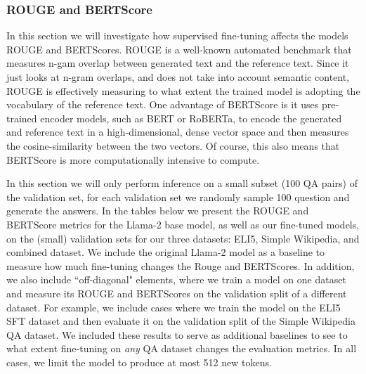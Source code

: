 \documentclass[11pt, oneside]{article}   	%
\begin{document}
\subsubsection{ROUGE and BERTScore}
In this section we will investigate how supervised fine-tuning affects the models ROUGE and BERTScores.
ROUGE is a well-known automated benchmark that measures n-gam overlap between generated text and the reference text.
Since it just looks at n-gram overlaps, and does not take into account semantic content, ROUGE is effectively measuring to what extent the trained model is adopting the vocabulary of the reference text.
One advantage of BERTScore is it uses pre-trained encoder models, such as BERT or RoBERTa, to encode the generated and reference text in a high-dimensional, dense vector space and then measures the cosine-similarity between the two vectors.
Of course, this also means that BERTScore is more computationally intensive to compute.

In this section we will only perform inference on a small subset (100 QA pairs) of the validation set, for each validation set we randomly sample 100 question and generate the answers.
In the tables below we present the ROUGE and BERTScore metrics for the Llama-2 base model, as well as our fine-tuned models, on the (small) validation sets for our three datasets: ELI5, Simple Wikipedia, and combined dataset.
We include the original Llama-2 model as a baseline to measure how much fine-tuning changes the Rouge and BERTScores.
In addition, we also include ``off-diagonal" elements, where we train a model on one dataset and measure its ROUGE and BERTScores on the validation split of a different dataset.
For example, we include cases where we train the model on the ELI5 SFT dataset and then evaluate it on the validation split of the Simple Wikipedia QA dataset.
We included these results to serve as additional baselines to see to what extent fine-tuning on \textit{any} QA dataset changes the evaluation metrics.
In all cases, we limit the model to produce at most 512 new tokens.
\\[10pt]
\end{document}
